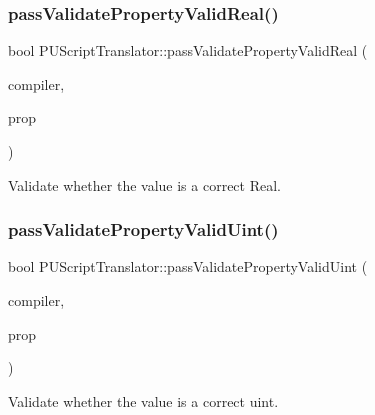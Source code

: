 \subsubsection{\texorpdfstring{pass\+Validate\+Property\+Valid\+Real()}{passValidatePropertyValidReal()}\hspace{0.1cm}{\footnotesize\ttfamily [2/2]}}
{\footnotesize\ttfamily bool P\+U\+Script\+Translator\+::pass\+Validate\+Property\+Valid\+Real (\begin{DoxyParamCaption}\item[{\hyperlink{classPUScriptCompiler}{P\+U\+Script\+Compiler} $\ast$}]{compiler,  }\item[{\hyperlink{classPUPropertyAbstractNode}{P\+U\+Property\+Abstract\+Node} $\ast$}]{prop }\end{DoxyParamCaption})}

Validate whether the value is a correct Real. \mbox{\label{classPUScriptTranslator_a3f49e03627517ef0e633f90c7c775f54}} 
\subsubsection{\texorpdfstring{pass\+Validate\+Property\+Valid\+Uint()}{passValidatePropertyValidUint()}\hspace{0.1cm}{\footnotesize\ttfamily [1/2]}}
{\footnotesize\ttfamily bool P\+U\+Script\+Translator\+::pass\+Validate\+Property\+Valid\+Uint (\begin{DoxyParamCaption}\item[{\hyperlink{classPUScriptCompiler}{P\+U\+Script\+Compiler} $\ast$}]{compiler,  }\item[{\hyperlink{classPUPropertyAbstractNode}{P\+U\+Property\+Abstract\+Node} $\ast$}]{prop }\end{DoxyParamCaption})}

Validate whether the value is a correct uint. \mbox{\label{classPUScriptTranslator_a3f49e03627517ef0e633f90c7c775f54}} 
